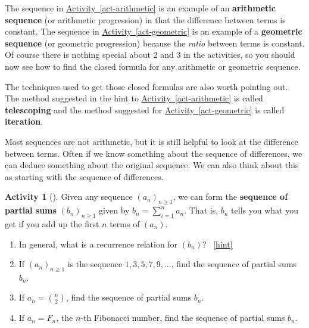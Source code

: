 \documentclass[10pt,]{book}
\newcommand{\terminology}[1]{\textbf{#1}}
\theoremstyle{plain}
\theoremstyle{definition}
\theoremstyle{definition}
\theoremstyle{definition}
\newtheorem{activity}[project]{Activity}
\numberwithin{equation}{chapter}
\begin{document}
\hypertarget{p-496}{}%
The sequence in \hyperref[act-arithmetic]{Activity~\ref{act-arithmetic}} is an example of an \terminology{arithmetic sequence} (or arithmetic progression) in that the difference between terms is constant.  The sequence in \hyperref[act-geometric]{Activity~\ref{act-geometric}} is an example of a \terminology{geometric sequence} (or geometric progression) because the \emph{ratio} between terms is constant.  Of course there is nothing special about 2 and 3 in the activities, so you should now see how to find the closed formula for any arithmetic or geometric sequence.%
\par
\hypertarget{p-497}{}%
The techniques used to get those closed formulas are also worth pointing out.  The method suggested in the hint to \hyperref[act-arithmetic]{Activity~\ref{act-arithmetic}} is called \terminology{telescoping} and the method suggested for \hyperref[act-geometric]{Activity~\ref{act-geometric}} is called \terminology{iteration}.%
\par
\hypertarget{p-498}{}%
Most sequences are not arithmetic, but it is still helpful to look at the difference between terms.  Often if we know something about the sequence of differences, we can deduce something about the original sequence.   We can also think about this as starting with the sequence of differences.%
\begin{activity}[]\label{activity-83}
\hypertarget{p-499}{}%
Given any sequence \((a_n)_{n \ge 1}\), we can form the \terminology{sequence of partial sums} \((b_n)_{n \ge 1}\) given by \(b_n = \sum_{i = 1}^n a_n\).  That is, \(b_n\) tells you what you get if you add up the first \(n\) terms of \((a_n)\).%
\begin{enumerate}[font=\bfseries,label=(\alph*),ref=\alph*]
\item\label{task-104} \hypertarget{p-500}{}%
In general, what is a recurrence relation for \((b_n)\)?%
~\hfill{\tiny\hyperlink{a-83.a}{[hint]}\hypertarget{q-83.a}{}}\item\label{task-105} \hypertarget{p-502}{}%
If \((a_n)_{n \ge 1}\) is the sequence \(1, 3, 5, 7, 9, \ldots\), find the sequence of partial sums \(b_n\).%
\item\label{task-106} \hypertarget{p-503}{}%
If \(a_n = \binom{n}{2}\), find the sequence of partial sums \(b_n\).%
\item\label{task-107} \hypertarget{p-504}{}%
If \(a_n = F_n\), the \(n\)-th Fibonacci number, find the sequence of partial sums \(b_n\).%
\end{enumerate}
\end{activity}
\end{document}
